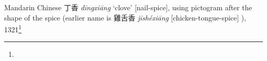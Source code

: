\begin{etymology}\label{ety:dingxiang}
Mandarin Chinese {丁香} \textit{dīngxiāng} `clove' [nail-spice], using pictogram after the shape of the spice (earlier name is 雞舌香 \textit{jīshéxiāng} [chicken-tongue-spice]  ), 1321\footnote{}
\end{etymology}